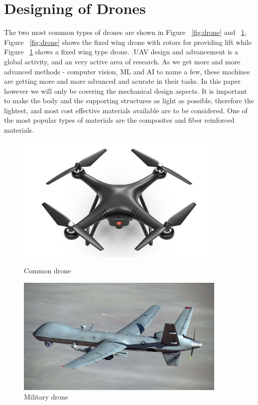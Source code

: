 \documentclass{article}
\begin{document}
\section{Designing of Drones}
The two most common types of drones are shown in Figure ~\ref{fig:drone} and ~\ref{fig:drone2}, Figure ~\ref{fig:drone} shows the fixed wing drone with rotors for providing lift while Figure ~\ref{fig:drone2} shows a fixed wing type drone.
.UAV design and advancement is a global activity, and an very active area of research.  As we get more and more advanced methods - computer vision, ML and AI to name a few, these machines are getting more and more advanced and acurate in their tasks. In this paper however we will only be covering the mechanical design aspects. 
It is important to make the body and the supporting structures as light as possible, therefore the lightest, and most cost effective materials available are to be considered. One of the most popular types of materials are the composites and fiber reinforced materials. 
\begin{figure}
    \centering
    \begin{minipage}{0.45\textwidth}
        \centering
        \includegraphics[width=0.9\textwidth]{drone.jpg} %
        \caption{Common drone}
        \label{fig:drone}
    \end{minipage}\hfill
    \begin{minipage}{0.45\textwidth}
        \centering
        \includegraphics[width=0.9\textwidth]{drone2.jpg} %
        \caption{Military drone}
        \label{fig:drone2}
    \end{minipage}
\end{figure}
\end{document}
